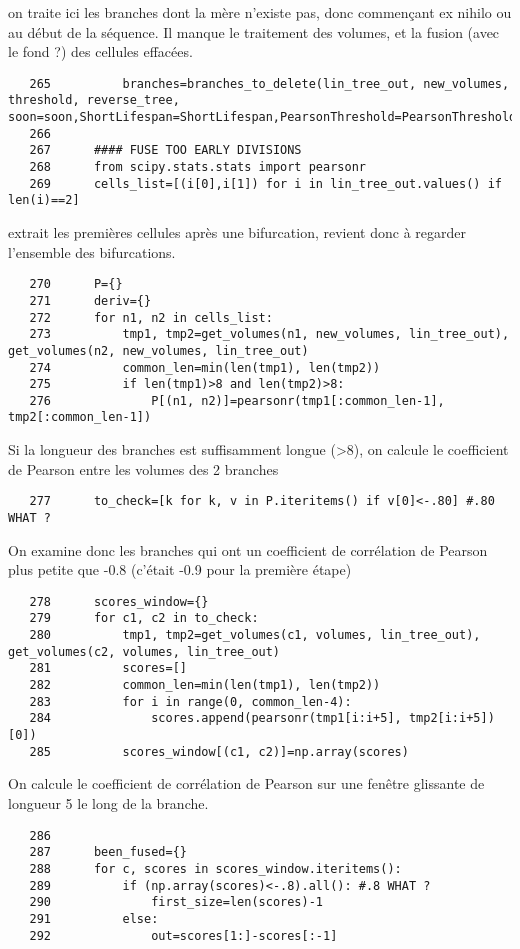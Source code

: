 \documentclass{article}
\def \mycolor {red}
\begin{document}
\color{\mycolor}
on traite ici les branches dont la m\`ere n'existe pas, donc commen\c{c}ant ex nihilo ou au d\'ebut de la s\'equence. Il manque le traitement des volumes, et la fusion (avec le fond ?) des cellules effac\'ees.
\color{black}
\begin{verbatim}
   265	        branches=branches_to_delete(lin_tree_out, new_volumes, threshold, reverse_tree, soon=soon,ShortLifespan=ShortLifespan,PearsonThreshold=PearsonThreshold,time_begin=time_begin,time_end=time_end)
   266	
   267	    #### FUSE TOO EARLY DIVISIONS
   268	    from scipy.stats.stats import pearsonr
   269	    cells_list=[(i[0],i[1]) for i in lin_tree_out.values() if len(i)==2]
\end{verbatim} 
\color{\mycolor}
extrait les premi\`eres cellules apr\`es une bifurcation, revient donc \`a regarder l'ensemble des bifurcations.
\color{black}
\begin{verbatim}
   270	    P={}
   271	    deriv={}
   272	    for n1, n2 in cells_list:
   273	        tmp1, tmp2=get_volumes(n1, new_volumes, lin_tree_out), get_volumes(n2, new_volumes, lin_tree_out)
   274	        common_len=min(len(tmp1), len(tmp2))
   275	        if len(tmp1)>8 and len(tmp2)>8: 
   276	            P[(n1, n2)]=pearsonr(tmp1[:common_len-1], tmp2[:common_len-1])
\end{verbatim} 
\color{\mycolor}
Si la longueur des branches est suffisamment longue (>8), on calcule le coefficient de Pearson entre les volumes des 2 branches 
\color{black}
\begin{verbatim}
   277	    to_check=[k for k, v in P.iteritems() if v[0]<-.80] #.80 WHAT ? 
\end{verbatim} 
\color{\mycolor}
On examine donc les branches qui ont un coefficient de corr\'elation de Pearson plus petite que -0.8 (c'\'etait -0.9 pour la premi\`ere \'etape)
\color{black}
\begin{verbatim}
   278	    scores_window={}
   279	    for c1, c2 in to_check:
   280	        tmp1, tmp2=get_volumes(c1, volumes, lin_tree_out), get_volumes(c2, volumes, lin_tree_out)
   281	        scores=[]
   282	        common_len=min(len(tmp1), len(tmp2))
   283	        for i in range(0, common_len-4):
   284	            scores.append(pearsonr(tmp1[i:i+5], tmp2[i:i+5])[0])
   285	        scores_window[(c1, c2)]=np.array(scores)
\end{verbatim} 
\color{\mycolor}
On calcule le coefficient de corr\'elation de Pearson sur une fen\^etre glissante de longueur 5 le long de la branche.
\color{black}
\begin{verbatim}
   286	
   287	    been_fused={}
   288	    for c, scores in scores_window.iteritems():
   289	        if (np.array(scores)<-.8).all(): #.8 WHAT ? 
   290	            first_size=len(scores)-1
   291	        else:
   292	            out=scores[1:]-scores[:-1]
\end{verbatim} 
\end{document}
